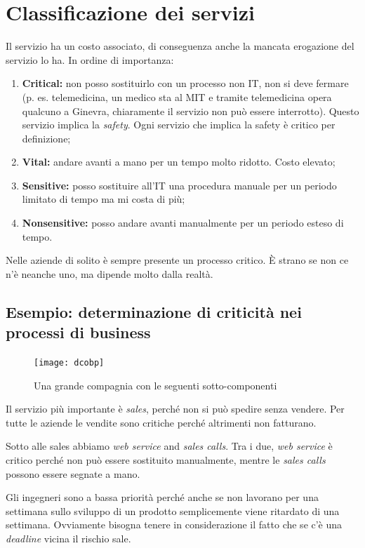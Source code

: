 \section{Classificazione dei servizi}

Il servizio ha un costo associato, di conseguenza anche la mancata erogazione
del servizio lo ha. In ordine di importanza:
\begin{enumerate}
 \item \textbf{Critical:} non posso sostituirlo con un processo non IT, non si
deve fermare (p. es. telemedicina, un medico sta al MIT e tramite telemedicina 
opera qualcuno a Ginevra, chiaramente il servizio non può essere interrotto).
Questo servizio implica la \textit{safety}. Ogni servizio che 
implica la safety è critico per definizione;
 \item \textbf{Vital:} andare avanti a mano per un tempo molto ridotto. Costo
elevato;
 \item \textbf{Sensitive:} posso sostituire all'IT una procedura manuale per un
periodo limitato di tempo ma mi costa di più;

 \item \textbf{Nonsensitive:} posso andare avanti manualmente per un periodo
esteso di tempo.

\end{enumerate}

Nelle aziende di solito è sempre presente un processo critico. È strano se non
ce n'è neanche uno, ma dipende molto dalla realtà.

\subsection{Esempio: determinazione di criticità nei processi di business}

\begin{figure}[H]
 \centering
 \texttt{[image: dcobp]}
 \caption{Una grande compagnia con le seguenti sotto-componenti}
\end{figure}

Il servizio più importante è \textit{sales}, perché non si può spedire senza
vendere. Per tutte le aziende le vendite sono critiche perché altrimenti non
fatturano.

Sotto alle sales abbiamo \textit{web service} and \textit{sales calls}. Tra i
due, \textit{web service} è critico perché non può essere sostituito manualmente, mentre
le \textit{sales calls} possono essere segnate a mano.

Gli ingegneri sono a bassa priorità perché anche se non lavorano per una
settimana sullo sviluppo di un prodotto semplicemente viene ritardato di una
settimana. Ovviamente bisogna tenere in considerazione il fatto che se c'è una
\textit{deadline} vicina il rischio sale.

